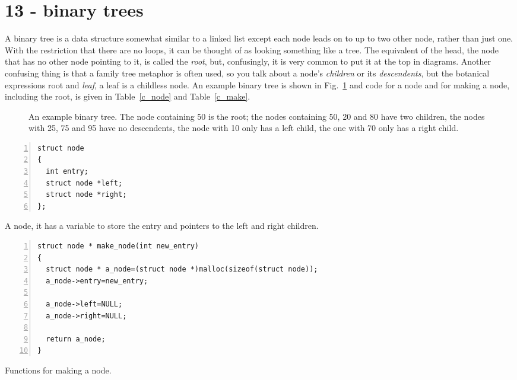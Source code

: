 \documentclass[11pt,a4paper]{scrartcl}
\begin{document}
\section*{13 - binary trees}

A binary tree is a data structure somewhat similar to a linked list
except each node leads on to up to two other node, rather than just
one. With the restriction that there are no loops, it can be thought
of as looking something like a tree. The equivalent of the head, the
node that has no other node pointing to it, is called the {\sl root},
but, confusingly, it is very common to put it at the top in
diagrams. Another confusing thing is that a family tree metaphor is
often used, so you talk about a node's {\sl children} or its {\sl
  descendents}, but the botanical expressions root and {\sl leaf}, a
leaf is a childless node. An example binary tree is shown in
Fig.~\ref{fig_example_tree} and code for a node and for making a node,
including the root, is given in Table~\ref{c_node} and
Table~\ref{c_make}.

\begin{figure}
\begin{center}
\end{center}
\caption{An example binary tree. The node containing 50 is the root; the nodes containing 50, 20 and 80 have two children, the nodes with 25, 75 and 95 have no descendents, the node with 10 only has a left child, the one with 70 only has a right child.\label{fig_example_tree}}
\end{figure}


\begin{table}
\begin{lstlisting}[numbers=left]
struct node
{
  int entry;
  struct node *left;
  struct node *right;
};
\end{lstlisting}
\caption{A node, it has a variable to store the entry and pointers to the left and right children. \label{c_node}}
\end{table}


\begin{table}
\begin{lstlisting}[numbers=left]
struct node * make_node(int new_entry)
{
  struct node * a_node=(struct node *)malloc(sizeof(struct node));
  a_node->entry=new_entry;

  a_node->left=NULL;
  a_node->right=NULL;

  return a_node;
}
\end{lstlisting}
\caption{Functions for making a node. \label{c_make}}
\end{table}
\end{document}
